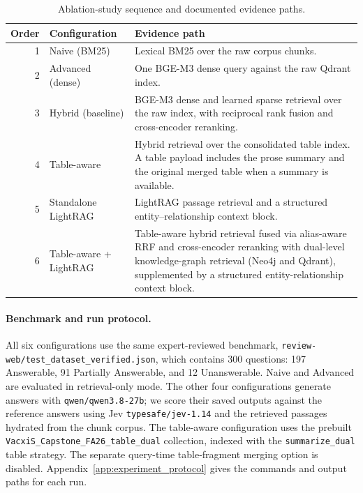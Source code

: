 \documentclass[sn-mathphys, oneside]{sn-jnl}
\newcommand{\artifact}[1]{\nolinkurl{#1}}
\begin{document}
\begin{table}[htbp]
\centering
\caption{Ablation-study sequence and documented evidence paths.}
\label{tab:sequence}
\begin{tabularx}{\linewidth}{rlX}
\toprule
Order & Configuration & Evidence path\\
\midrule
1 & Naive (BM25) & Lexical BM25 over the raw corpus chunks.\\
2 & Advanced (dense) & One BGE-M3 dense query against the raw Qdrant index.\\
3 & Hybrid (baseline) & BGE-M3 dense and learned sparse retrieval over the raw index, with reciprocal rank fusion and cross-encoder reranking.\\
4 & Table-aware & Hybrid retrieval over the consolidated table index. A table payload includes the prose summary and the original merged table when a summary is available.\\
5 & Standalone LightRAG & LightRAG passage retrieval and a structured entity--relationship context block.\\
6 & Table-aware + LightRAG & Table-aware hybrid retrieval fused via alias-aware RRF and cross-encoder reranking with dual-level knowledge-graph retrieval (Neo4j and Qdrant), supplemented by a structured entity-relationship context block.\\
\bottomrule
\end{tabularx}
\end{table}

\paragraph{Benchmark and run protocol.}
All six configurations use the same expert-reviewed benchmark, \artifact{review-web/test_dataset_verified.json}, which contains 300 questions: 197 Answerable, 91 Partially Answerable, and 12 Unanswerable. Naive and Advanced are evaluated in retrieval-only mode. The other four configurations generate answers with \artifact{qwen/qwen3.8-27b}; we score their saved outputs against the reference answers using Jev \artifact{typesafe/jev-1.14} and the retrieved passages hydrated from the chunk corpus. The table-aware configuration uses the prebuilt \artifact{VacxiS\_Capstone\_FA26\_table\_dual} collection, indexed with the \artifact{summarize\_dual} table strategy. The separate query-time table-fragment merging option is disabled. Appendix~\ref{app:experiment_protocol} gives the commands and output paths for each run.
\end{document}
